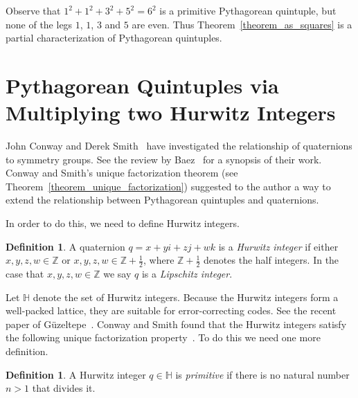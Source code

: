 \documentclass[12pt,table]{article}
\theoremstyle{definition}
\newtheorem{definition}[theorem]{Definition}
\theoremstyle{remark}
\newcommand{\Hhh}{\mathbb H}
\newcommand{\Zzz}{\mathbb Z}
\newcommand{\vanish}[1]{}
\numberwithin{equation}{section}
\begin{document}
\vanish{
\begin{eqnarray*}
     (ix+jy+kz+w)^2
      &=& -x^2+kxy-jxz+ixw-kxy-y^2+iyz+jyw\\
      & & + jxz-iyz-z^2+kzw+ixw+jyw+kzw+w^2\\
      &=& i(2xw)+j(2yw)+k(2zw)-(x^2+y^2+z^2-w^2)
\end{eqnarray*}
}

\noindent

Observe 
that
$1^2+ 1^2+ 3^2+ 5^2= 6^2$ is a 
primitive Pythagorean quintuple, but none of the
legs  $1$, $1$, $3$ and $5$ are even.
Thus Theorem~\ref{theorem_as_squares} is a partial characterization
of Pythagorean quintuples.




\section{Pythagorean Quintuples via Multiplying two Hurwitz Integers}

John Conway and Derek Smith~\cite{Conway_and_Smith}
have investigated the relationship of quaternions
to symmetry groups.  See the review by Baez~\cite{Baez}
for a synopsis of their work.
Conway and Smith's unique factorization theorem 
(see Theorem~\ref{theorem_unique_factorization}) suggested to
the author a way to extend
the relationship between Pythagorean quintuples
and quaternions.


In order to do this, we need to define Hurwitz integers.

\begin{definition}
A quaternion $q = x+yi+zj+wk$ is a
{\em Hurwitz integer}
if either $x, y, z, w \in \Zzz$ 
or
$x, y, z, w \in \Zzz + \frac{1}{2}$,
where
$\Zzz + \frac{1}{2}$ denotes the half integers.
In the case that
$x, y, z, w \in \Zzz$
we say $q$ is a {\em Lipschitz integer}.
\end{definition}
Let $\Hhh$ denote the set of Hurwitz integers.
Because the Hurwitz integers form a well-packed lattice,
they are suitable for error-correcting codes.
See the recent paper of G\"uzeltepe~\cite{Guzeltepe}.
Conway and Smith found that the Hurwitz integers satisfy
the following unique factorization 
property~\cite[Ch.\ 5, Theorem 2]{Conway_and_Smith}.
To do this we need one more definition.



\begin{definition}
A Hurwitz integer $q \in \Hhh$ is
{\em primitive} if there is no natural number $n > 1$ that divides it.
\end{definition}
\end{document}
